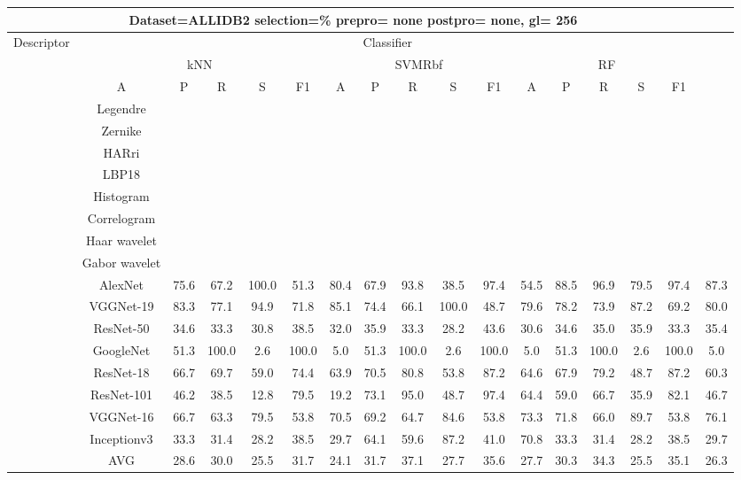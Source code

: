 \documentclass[12pt,italian]{article}
\begin{document}
\begin{tiny}
 \pagebreak 
\begin{longtable}{lcccccccccccccccc}
\toprule
\multicolumn{16}{c}{Dataset=ALLIDB2 selection=\% prepro= none postpro= none, gl= 256} \\ 
\toprule
Descriptor & \multicolumn{15}{c}{Classifier} \\ 
& \multicolumn{5}{c}{kNN} & \multicolumn{5}{c}{SVMRbf} & \multicolumn{5}{c}{RF} \\ 
& A & P & R & S & F1 & A & P & R & S & F1 & A & P & R & S & F1 \\ 
\midrule
& Legendre \\ 
& Zernike \\ 
& HARri \\ 
& LBP18 \\ 
& Histogram \\ 
& Correlogram \\ 
& Haar wavelet \\ 
& Gabor wavelet \\ 
& AlexNet & 75.6 & 67.2 & 100.0 & 51.3 & 80.4 & 67.9 & 93.8 & 38.5 & 97.4 & 54.5 & 88.5 & 96.9 & 79.5 & 97.4 & 87.3 \\ 
& VGGNet-19 & 83.3 & 77.1 & 94.9 & 71.8 & 85.1 & 74.4 & 66.1 & 100.0 & 48.7 & 79.6 & 78.2 & 73.9 & 87.2 & 69.2 & 80.0 \\ 
& ResNet-50 & 34.6 & 33.3 & 30.8 & 38.5 & 32.0 & 35.9 & 33.3 & 28.2 & 43.6 & 30.6 & 34.6 & 35.0 & 35.9 & 33.3 & 35.4 \\ 
& GoogleNet & 51.3 & 100.0 &  2.6 & 100.0 &  5.0 & 51.3 & 100.0 &  2.6 & 100.0 &  5.0 & 51.3 & 100.0 &  2.6 & 100.0 &  5.0 \\ 
& ResNet-18 & 66.7 & 69.7 & 59.0 & 74.4 & 63.9 & 70.5 & 80.8 & 53.8 & 87.2 & 64.6 & 67.9 & 79.2 & 48.7 & 87.2 & 60.3 \\ 
& ResNet-101 & 46.2 & 38.5 & 12.8 & 79.5 & 19.2 & 73.1 & 95.0 & 48.7 & 97.4 & 64.4 & 59.0 & 66.7 & 35.9 & 82.1 & 46.7 \\ 
& VGGNet-16 & 66.7 & 63.3 & 79.5 & 53.8 & 70.5 & 69.2 & 64.7 & 84.6 & 53.8 & 73.3 & 71.8 & 66.0 & 89.7 & 53.8 & 76.1 \\ 
& Inceptionv3 & 33.3 & 31.4 & 28.2 & 38.5 & 29.7 & 64.1 & 59.6 & 87.2 & 41.0 & 70.8 & 33.3 & 31.4 & 28.2 & 38.5 & 29.7 \\ 
\hline
& AVG & 28.6 & 30.0 & 25.5 & 31.7 & 24.1 & 31.7 & 37.1 & 27.7 & 35.6 & 27.7 & 30.3 & 34.3 & 25.5 & 35.1 & 26.3 \\ 
\hline
\bottomrule
\end{longtable} 

 \pagebreak 
\end{tiny} 
 
\end{document}
